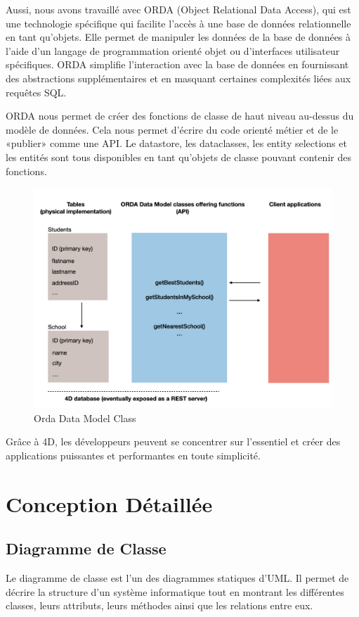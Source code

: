Aussi, nous avons travaillé avec ORDA (Object Relational Data Access), qui est une technologie spécifique qui facilite
l’accès à une base de données relationnelle en tant qu’objets. Elle permet de manipuler les
données de la base de données à l’aide d’un langage de programmation orienté objet ou
d’interfaces utilisateur spécifiques. ORDA simplifie l’interaction avec la base de données
en fournissant des abstractions supplémentaires et en masquant certaines complexités liées
aux requêtes SQL.

ORDA nous permet de créer des fonctions de classe de haut niveau au-dessus du modèle de données. Cela nous permet d'écrire du code orienté métier et de le «publier» comme une API. Le datastore, les dataclasses, les entity selections et les entités sont tous disponibles en tant qu'objets de classe pouvant contenir des fonctions.

\begin{figure}[H]
    \centering
    \includegraphics[width=15cm]{Figures/orda.png}
    \caption{Orda Data Model Class}
\end{figure}

Grâce à 4D, les développeurs peuvent se concentrer sur l’essentiel et créer des applications puissantes et performantes en toute simplicité.


\section{Conception Détaillée}

\subsection{Diagramme de Classe}
Le diagramme de classe est l’un des diagrammes statiques d’UML. Il permet de décrire
la structure d’un système informatique tout en montrant les différentes classes, leurs
attributs, leurs méthodes ainsi que les relations entre eux.

